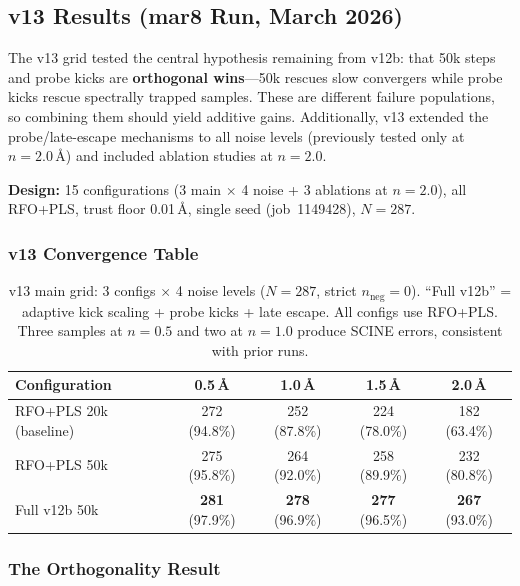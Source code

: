 \documentclass[11pt,a4paper]{article}
\theoremstyle{definition}
\begin{document}
\subsection{v13 Results (mar8 Run, March 2026)}
\label{sec:v13}

The v13 grid tested the central hypothesis remaining from v12b: that
50k steps and probe kicks are \textbf{orthogonal wins}---50k rescues
slow convergers while probe kicks rescue spectrally trapped samples.
These are different failure populations, so combining them should yield
additive gains.  Additionally, v13 extended the probe/late-escape
mechanisms to all noise levels (previously tested only at $n=2.0$\,\AA)
and included ablation studies at $n=2.0$.

\textbf{Design:} 15 configurations (3 main $\times$ 4 noise + 3
ablations at $n=2.0$), all RFO+PLS, trust floor 0.01\,\AA, single seed
(job~1149428), $N=287$.

\subsubsection{v13 Convergence Table}
\label{sec:v13-table}

\begin{table}[h]
\centering
\caption{v13 main grid: 3 configs $\times$ 4 noise levels ($N=287$, strict
  $n_\text{neg}=0$).  ``Full v12b'' = adaptive kick scaling + probe kicks
  + late escape.  All configs use RFO+PLS.  Three samples at $n=0.5$ and
  two at $n=1.0$ produce SCINE errors, consistent with prior runs.}
\label{tab:v13}
\begin{tabular}{lcccc}
\toprule
Configuration & 0.5\,\AA & 1.0\,\AA & 1.5\,\AA & 2.0\,\AA \\
\midrule
RFO+PLS 20k (baseline) & 272 (94.8\%) & 252 (87.8\%) & 224 (78.0\%) & 182 (63.4\%) \\
RFO+PLS 50k            & 275 (95.8\%) & 264 (92.0\%) & 258 (89.9\%) & 232 (80.8\%) \\
Full v12b 50k           & \textbf{281} (97.9\%) & \textbf{278} (96.9\%) & \textbf{277} (96.5\%) & \textbf{267} (93.0\%) \\
\bottomrule
\end{tabular}
\end{table}

\subsubsection{The Orthogonality Result}
\label{sec:v13-orthogonality}
\end{document}

